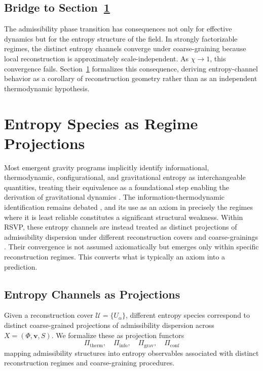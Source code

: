 \documentclass[11pt, a4paper]{article}
\theoremstyle{plain}
\theoremstyle{definition}
\theoremstyle{remark}
\newcommand{\cover}{\{U_\alpha\}}
\newcommand{\Ucover}{\mathcal{U}}
\begin{document}
\subsection{Bridge to Section~\ref{sec:entropy}}

The admissibility phase transition has consequences not only for effective dynamics
but for the entropy structure of the field. In strongly factorizable regimes, the
distinct entropy channels converge under coarse-graining because local reconstruction
is approximately scale-independent. As $\chi \to 1$, this convergence fails.
Section~\ref{sec:entropy} formalizes this consequence, deriving entropy-channel
behavior as a corollary of reconstruction geometry rather than as an independent
thermodynamic hypothesis.

\section{Entropy Species as Regime Projections}
\label{sec:entropy}

Most emergent gravity programs implicitly identify informational, thermodynamic,
configurational, and gravitational entropy as interchangeable quantities, treating
their equivalence as a foundational step enabling the derivation of gravitational
dynamics \cite{verlinde2011,kastner2024}. The information-thermodynamic
identification remains debated \cite{jaynes1957}, and its use as an axiom in
precisely the regimes where it is least reliable constitutes a significant structural
weakness. Within RSVP, these entropy channels are instead treated as distinct
projections of admissibility dispersion under different reconstruction covers and
coarse-grainings \cite{amari2016}. Their convergence is not assumed axiomatically
but emerges only within specific reconstruction regimes. This converts what is
typically an axiom into a prediction.

\subsection{Entropy Channels as Projections}

Given a reconstruction cover $\Ucover = \cover$, different entropy species correspond
to distinct coarse-grained projections of admissibility dispersion across
$X = (\Phi, \mathbf{v}, S)$.  We formalize these as projection functors
\[
  \Pi_{\mathrm{therm}},\quad
  \Pi_{\mathrm{info}},\quad
  \Pi_{\mathrm{grav}},\quad
  \Pi_{\mathrm{conf}}
\]
mapping admissibility structures into entropy observables associated with distinct
reconstruction regimes and coarse-graining procedures.
\end{document}
